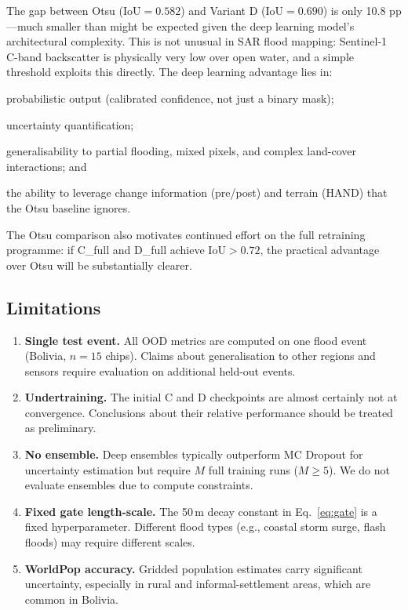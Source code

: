 \documentclass[12pt]{article}
\newcommand{\IoU}{\mathrm{IoU}}
\begin{document}
The gap between Otsu ($\IoU=0.582$) and Variant D ($\IoU=0.690$) is only
10.8 pp—much smaller than might be expected given the deep learning model's
architectural complexity.  This is not unusual in SAR flood mapping: Sentinel-1
C-band backscatter is physically very low over open water, and a simple
threshold exploits this directly.  The deep learning advantage lies in:
\begin{enumerate*}[label=(\roman*)]
  \item probabilistic output (calibrated confidence, not just a binary mask);
  \item uncertainty quantification;
  \item generalisability to partial flooding, mixed pixels, and complex
        land-cover interactions; and
  \item the ability to leverage change information (pre/post) and terrain (HAND)
        that the Otsu baseline ignores.
\end{enumerate*}
The Otsu comparison also motivates continued effort on the full retraining
programme: if C\_full and D\_full achieve $\IoU > 0.72$, the practical
advantage over Otsu will be substantially clearer.

\subsection{Limitations}

\begin{enumerate}
  \item \textbf{Single test event.}  All OOD metrics are computed on one
        flood event (Bolivia, $n=15$ chips).  Claims about generalisation to
        other regions and sensors require evaluation on additional held-out
        events.
  \item \textbf{Undertraining.}  The initial C and D checkpoints are almost
        certainly not at convergence.  Conclusions about their relative
        performance should be treated as preliminary.
  \item \textbf{No ensemble.}  Deep ensembles \cite{lakshminarayanan2017simple}
        typically outperform MC Dropout for uncertainty estimation but require
        $M$ full training runs ($M \geq 5$).  We do not evaluate ensembles
        due to compute constraints.
  \item \textbf{Fixed gate length-scale.}  The 50\,m decay constant in
        Eq.~\ref{eq:gate} is a fixed hyperparameter.  Different flood types
        (e.g., coastal storm surge, flash floods) may require different scales.
  \item \textbf{WorldPop accuracy.}  Gridded population estimates carry
        significant uncertainty, especially in rural and informal-settlement
        areas, which are common in Bolivia.
\end{enumerate}
\end{document}
